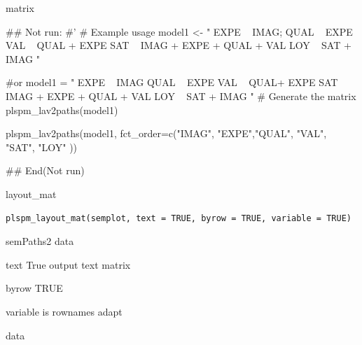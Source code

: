 \documentclass[a4paper]{book}
\begin{document}
%
\begin{Value}
matrix
\end{Value}
%
\begin{Examples}
\begin{ExampleCode}
\#\# Not run: 
#'
# Example usage
model1 <- "
EXPE ~ IMAG; QUAL ~ EXPE
VAL ~ QUAL + EXPE
SAT ~ IMAG + EXPE + QUAL + VAL
LOY ~ SAT + IMAG
"

 #or
model1 = "
EXPE ~ IMAG
QUAL ~ EXPE
VAL ~  QUAL+ EXPE
SAT ~ IMAG + EXPE + QUAL + VAL
LOY ~ SAT + IMAG
"
# Generate the matrix
plspm_lav2paths(model1)

plspm_lav2paths(model1, fct_order=c("IMAG", "EXPE","QUAL", "VAL", "SAT", "LOY" ))



## End(Not run)

\end{ExampleCode}
\end{Examples}
%
\begin{Description}
layout\_mat
\end{Description}
%
\begin{Usage}
\begin{verbatim}
plspm_layout_mat(semplot, text = TRUE, byrow = TRUE, variable = TRUE)
\end{verbatim}
\end{Usage}
%
\begin{Arguments}
\begin{ldescription}
\item[\code{semplot}] semPaths2 data

\item[\code{text}] text True output text matrix

\item[\code{byrow}] byrow TRUE

\item[\code{variable}] variable is rownames adapt
\end{ldescription}
\end{Arguments}
%
\begin{Value}
data
\end{Value}
%
\end{document}
